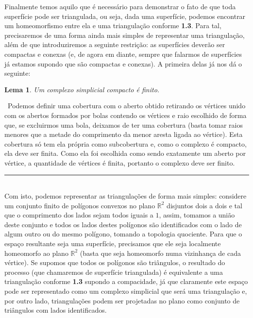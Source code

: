 \documentclass[12pt,a4paper]{article}
\newtheorem{lem}[mydef]{Lema}
\def\dem{\par\smallbreak\noindent {\textit{ Demonstração:}} \ }
\def\eop{\hfill\rule{2.5mm}{2.5mm} \\ }
\theoremstyle{definition}
\begin{document}
Finalmente temos aquilo que é necessário para demonstrar o fato de que toda superfície pode ser triangulada, ou seja, dada uma superfície, podemos encontrar um homeomorfismo entre ela e uma triangulação conforme \textbf{1.3}. Para tal, precisaremos de uma forma ainda mais simples de representar uma triangulação, além de que introduziremos a seguinte restrição: as superfícies deverão ser compactas e conexas (e, de agora em diante, sempre que falarmos de superfícies já estamos supondo que são compactas e conexas). A primeira delas já nos dá o seguinte:

\begin{lem}

    Um complexo simplicial compacto é finito.

\end{lem}


\dem Podemos definir uma cobertura com o aberto obtido retirando os vértices unido com os abertos formados por bolas contendo os vértices e raio escolhido de forma que, se excluirmos uma bola, deixamos de ter uma cobertura (basta tomar raios menores que a metade do comprimento da menor aresta ligada ao vértice). Esta cobertura só tem ela própria como subcobertura e, como o complexo é compacto, ela deve ser finita. Como ela foi escolhida como sendo exatamente um aberto por vértice, a quantidade de vértices é finita, portanto o complexo deve ser finito. \eop

Com isto, podemos representar as triangulações de forma mais simples: considere um conjunto finito de polígonos convexos no plano $\mathbb{R}^2$ disjuntos dois a dois e tal que o comprimento dos lados sejam todos iguais a $1$, assim, tomamos a união deste conjunto e todos os lados destes polígonos são identificados com o lado de algum outro ou do mesmo polígono, tomando a topologia quociente. Para que o espaço resultante seja uma superfície, precisamos que ele seja localmente homeomorfo ao plano $\mathbb{R}^2$ (basta que seja homeomorfo numa vizinhança de cada vértice). Se supomos que todos os polígonos são triângulos, o resultado do processo (que chamaremos de superfície triangulada) é equivalente a uma triangulação conforme \textbf{1.3} supondo a compacidade, já que claramente este espaço pode ser representado como um complexo simplicial que será uma triangulação e, por outro lado, triangulações podem ser projetadas no plano como conjunto de triângulos com lados identificados. 
\end{document}

